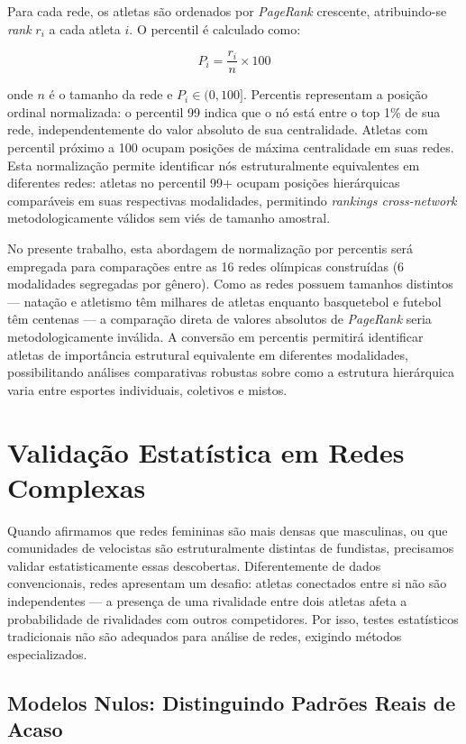Para cada rede, os atletas são ordenados por \textit{PageRank}{} crescente, atribuindo-se \textit{rank} $r_i$ a cada atleta $i$. O percentil é calculado como:

\begin{equation}
    P_i = \frac{r_i}{n} \times 100
\end{equation}

\noindent onde $n$ é o tamanho da rede e $P_i \in (0, 100]$. Percentis representam a posição ordinal normalizada: o percentil 99 indica que o nó está entre o top 1\% de sua rede, independentemente do valor absoluto de sua centralidade. Atletas com percentil próximo a 100 ocupam posições de máxima centralidade em suas redes. Esta normalização permite identificar nós estruturalmente equivalentes em diferentes redes: atletas no percentil 99+ ocupam posições hierárquicas comparáveis em suas respectivas modalidades, permitindo \textit{rankings cross-network} metodologicamente válidos sem viés de tamanho amostral.

No presente trabalho, esta abordagem de normalização por percentis será empregada para comparações entre as 16 redes olímpicas construídas (6 modalidades segregadas por gênero). Como as redes possuem tamanhos distintos --- natação e atletismo têm milhares de atletas enquanto basquetebol e futebol têm centenas --- a comparação direta de valores absolutos de \textit{PageRank}{} seria metodologicamente inválida. A conversão em percentis permitirá identificar atletas de importância estrutural equivalente em diferentes modalidades, possibilitando análises comparativas robustas sobre como a estrutura hierárquica varia entre esportes individuais, coletivos e mistos.

\section{Validação Estatística em Redes Complexas}

Quando afirmamos que redes femininas são mais densas que masculinas, ou que comunidades de velocistas são estruturalmente distintas de fundistas, precisamos validar estatisticamente essas descobertas. Diferentemente de dados convencionais, redes apresentam um desafio: atletas conectados entre si não são independentes --- a presença de uma rivalidade entre dois atletas afeta a probabilidade de rivalidades com outros competidores. Por isso, testes estatísticos tradicionais não são adequados para análise de redes, exigindo métodos especializados.

\subsection{Modelos Nulos: Distinguindo Padrões Reais de Acaso}

